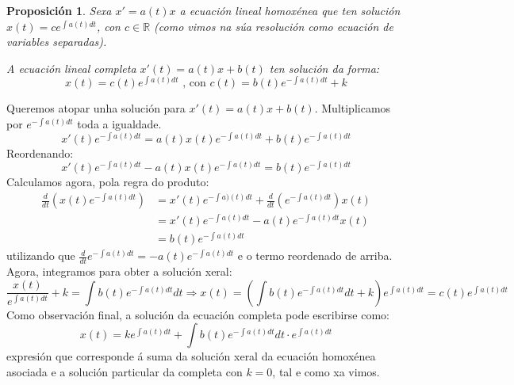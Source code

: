\documentclass[11pt, a4paper,twoside]{article}
\makeatletter
\theoremstyle{theorem-style}  %
\newtheorem{proposition}[theorem]{Proposición}
\renewenvironment{proof}[1][\proofname]{\par
	\pushQED{\qed}%
	\normalfont \topsep6\p@\@plus6\p@\relax
	\list{}{%
		\settowidth{\leftmargin}{\quad:\hskip\labelsep}%
		\setlength{\labelwidth}{0pt}%
		\setlength{\itemindent}{-\leftmargin}%
	}%
	\item[\hskip\labelsep\itshape#1\@addpunct{:}]\ignorespaces
}{%
	\popQED\endlist\@endpefalse
}
\theoremstyle{definition-style}
\theoremstyle{example-style}
\makeatother
\begin{document}
\begin{proposition}\label{ecLinCompleta}
	Sexa $ x'=a(t)x $ a ecuación lineal homoxénea que ten solución $ x(t)=c e^{\int a(t) dt} $, con $ c\in \mathbb{R} $ (como vimos na súa resolución como ecuación de variables separadas). 
	
	A ecuación lineal completa $ x'(t)=a(t)x+b(t) $ ten solución da forma: \[ x(t)= c(t)e^{\int a(t) dt}\text{ , con } c(t)= b(t)e^{-\int a(t) dt}+k\]
\end{proposition}
\begin{proof}
	Queremos atopar unha solución para $ x'(t)=a(t)x+b(t) $. Multiplicamos por $ e^{-\int a(t)dt} $  toda a igualdade.
	\[ x'(t)e^{-\int a(t)dt}=a(t)x(t)e^{-\int a(t)dt}+b(t)e^{-\int a(t)dt}\]
	Reordenando:
	\[  x'(t)e^{-\int a(t)dt}-a(t)x(t)e^{-\int a(t)dt}=b(t)e^{-\int a(t)dt} \]
	Calculamos agora, pola regra do produto:	
	\[ \begin{split}
	\frac{d}{dt}\left( x(t)e^{-\int a(t)dt}\right) &=x'(t)e^{-\int a)(t)dt}+\frac{d}{dt}\left( e^{-\int a(t)dt}\right) x(t)\\
	&=x'(t)e^{-\int a(t)dt}-a(t)e^{-\int a(t)dt}x(t)\\
	&=b(t)e^{-\int a(t)dt}
	\end{split} \]
	utilizando que $ \frac{d}{dt}e^{-\int a(t)dt}=-a(t)e^{-\int a(t)dt} $ e o termo reordenado de arriba.
	Agora, integramos para obter a solución xeral:
	\[ \frac{x(t)}{e^{\int a(t)dt}}+k= \int b(t)e^{-\int a(t)dt} dt\Rightarrow x(t)= \left( \int b(t)e^{-\int a(t)dt} dt+k\right) e^{\int a(t)dt}=c(t)e^{\int a(t)dt} \]
	Como observación final, a solución da ecuación completa pode escribirse como:
	\[ x(t)= ke^{\int a(t)dt}+\int b(t)e^{-\int a(t)dt} dt\cdot e^{\int a(t)dt} \]
	 expresión que corresponde á suma da solución xeral da ecuación homoxénea asociada e a solución particular da completa con $ k=0 $, tal e como xa vimos.
\end{proof}
\end{document}
